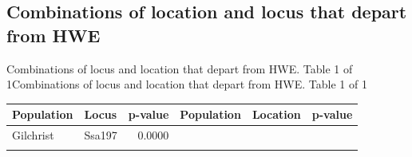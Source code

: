 \documentclass[a4paper]{scrartcl}\usepackage[]{graphicx}\usepackage[]{color}
\begin{document}
\FloatBarrier

\subsection{Combinations of location and locus that depart from HWE}

Combinations of locus and location that depart from HWE. Table 1 of 
 1Combinations of locus and location that depart from HWE. Table 1 of 1%
\begin{table}[ht]
\centering
\begin{tabular}{llrllr}
  \hline
Population & Locus & p-value & Population  & Location  & p-value  \\ 
  \hline
Gilchrist & Ssa197 & 0.0000 &  &  &  \\ 
   \rowcolor[gray]{0.9}  \hline
\end{tabular}
\end{table}




\FloatBarrier
\end{document}
